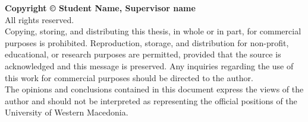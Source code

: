 \clearpage
\thispagestyle{empty}

{\normalsize \textbf{Copyright © \the\year{} Student Name, Supervisor name}}\\
All rights reserved.\\
\newline
Copying, storing, and distributing this thesis, in whole or in part, for commercial purposes is prohibited. Reproduction, storage, and distribution for non-profit, educational, or research purposes are permitted, provided that the source is acknowledged and this message is preserved. Any inquiries regarding the use of this work for commercial purposes should be directed to the author.\\
\newline
The opinions and conclusions contained in this document express the views of the author and should not be interpreted as representing the official positions of the University of Western Macedonia.